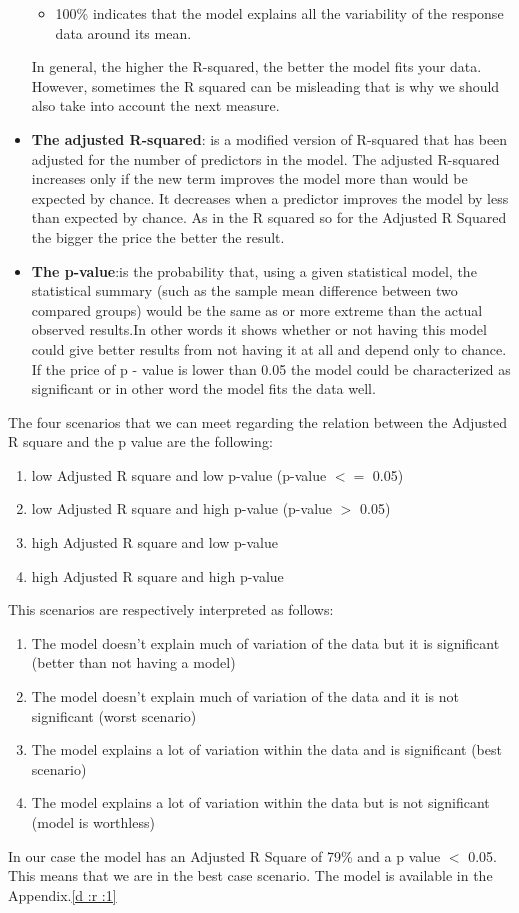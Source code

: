 \documentclass{article}
\begin{document}
\begin{itemize}
\begin{itemize}
\item 100\% indicates that the model explains all the variability of the response data around its mean.
\end{itemize}
In general, the higher the R-squared, the better the model fits your data. However, sometimes the R squared can be misleading that is why we should also take into account the next measure.
\item \textbf{The adjusted R-squared}: is a modified version of R-squared that has been adjusted for the number of predictors in the model. The adjusted R-squared increases only if the new term improves the model more than would be expected by chance. It decreases when a predictor improves the model by less than expected by chance. As in the R squared so for the Adjusted R Squared the bigger the price the better the result.
\item \textbf{The p-value}:is the probability that, using a given statistical model, the statistical summary (such as the sample mean difference between two compared groups) would be the same as or more extreme than the actual observed results.In other words it shows whether or not having this model could give better results from not having it at all and depend only to chance. If the price of p - value is lower than 0.05 the model could be characterized as significant or in other word the model fits the data well.
\end{itemize}  
The four scenarios that we can meet regarding the relation between the Adjusted R square and the p value are the following:
\begin{enumerate}
\item low Adjusted R square and low p-value (p-value $<=$ 0.05)
\item low Adjusted R square and high p-value (p-value $>$ 0.05)
\item high Adjusted R square and low p-value
\item high Adjusted R square and high p-value
\end{enumerate}
This scenarios are respectively interpreted as follows:
\begin{enumerate}
\item The model doesn't explain much of variation of the data but it is significant (better than not having a model)
\item The model doesn't explain much of variation of the data and it is not significant (worst scenario)
\item The model explains a lot of variation within the data and is significant (best scenario)
\item The model explains a lot of variation within the data but is not significant (model is worthless)
\end{enumerate}
In our case the model has an Adjusted R Square of 79\% and a p value $<$ 0.05. This means that we are in the best case scenario. The model is available in the Appendix.\ref{d :r :1}
\end{document}
